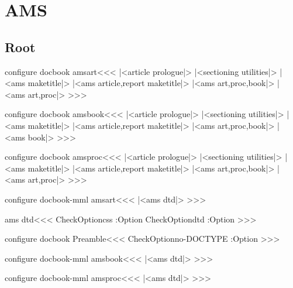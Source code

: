 \chapter{AMS}


\section{Root}


\<configure docbook amsart\><<< 
|<article prologue|>
|<sectioning utilities|>
|<ams maketitle|>
|<ams article,report maketitle|>
|<ams art,proc,book|>
|<ams art,proc|>
>>>

\<configure docbook amsbook\><<< 
|<article prologue|>
|<sectioning utilities|>
|<ams maketitle|>
|<ams article,report maketitle|>
|<ams art,proc,book|>
|<ams book|>
>>>

\<configure docbook amsproc\><<< 
|<article prologue|>
|<sectioning utilities|>
|<ams maketitle|>
|<ams article,report maketitle|>
|<ams art,proc,book|>
|<ams art,proc|>
>>>

\<configure docbook-mml amsart\><<< 
|<ams dtd|>
>>>

\<ams dtd\><<<
\:CheckOption{css} \if:Option
   \:CheckOption{dtd} \if:Option
         {}
        {}
        {}
   \else
         {}
      {}
        {}
   \fi
\else
      {}
     {}
\fi
>>>



\<configure docbook Preamble\><<<  
\:CheckOption{no-DOCTYPE} \if:Option
\fi
>>>



\<configure docbook-mml amsbook\><<< 
|<ams dtd|>
>>>

\<configure docbook-mml amsproc\><<< 
|<ams dtd|>
>>>



